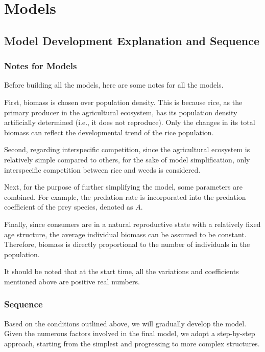 \documentclass{HZNUMCM}
\begin{document}
  \section{Models}
    \subsection{Model Development Explanation and Sequence}
      \subsubsection{Notes for Models}
        Before building all the models, here are some notes for all the models.
        
        First, biomass is chosen over population density. This is because rice, 
        as the primary producer in the agricultural ecosystem, 
        has its population density artificially determined (i.e., it does not reproduce). 
        Only the changes in its total biomass can reflect the developmental trend of the rice population.
        
        Second, regarding interspecific competition, since the agricultural ecosystem is relatively simple compared to others, 
        for the sake of model simplification, only interspecific competition between rice and weeds is considered. 

        Next, for the purpose of further simplifying the model, some parameters are combined. 
        For example, the predation rate is incorporated into the predation coefficient of the prey species, denoted as \(A\).
        
        Finally, since consumers are in a natural reproductive state with a relatively fixed age structure, 
        the average individual biomass can be assumed to be constant. 
        Therefore, biomass is directly proportional to the number of individuals in the population.
        
        It should be noted that at the start time, all the variations and coefficients mentioned above are positive real numbers.
      \subsubsection{Sequence}  
        Based on the conditions outlined above, we will gradually develop the model. 
        Given the numerous factors involved in the final model, we adopt a step-by-step approach, 
        starting from the simplest and progressing to more complex structures.
        
\end{document}
